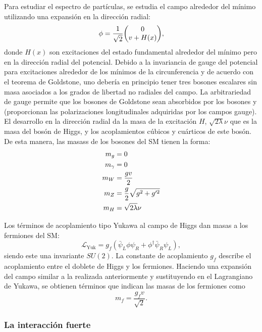 Para estudiar el espectro de partículas, se estudia el campo alrededor del mínimo utilizando una expansión en la dirección radial:
\begin{equation}
    \phi = \frac{1}{\sqrt{2}} \mqty(0 \\ v + H(x)),
\end{equation}
donde \(H(x)\) son excitaciones del estado fundamental alrededor del mínimo pero en la dirección radial del potencial.
Debido a la invariancia de gauge del potencial para excitaciones alrededor de los mínimos de la circunferencia y de acuerdo con el teorema de Goldstone, uno debería en principio tener tres bosones escalares sin masa asociados a los grados de libertad no radiales del campo. La arbitrariedad de gauge permite que los bosones de Goldstone sean absorbidos por los bosones \Wboson y \Zboson (proporcionan las polarizaciones longitudinales adquiridas por los campos gauge). El desarrollo en la dirección radial da la masa de la excitación \(H\), \(\sqrt{2\lambda}\nu\) que es la masa del bosón de Higgs, y los acoplamientos cúbicos y cuárticos de este bosón. De esta manera, las masass de los bosones del \ac{SM} tienen la forma:
\begin{align}
    m_{g} &= 0\\
    m_{\gamma} &= 0\\
    m_{W} & = \frac{g v}{2}\\
    m_{Z} & = \frac{g}{2} \sqrt{g^2 + g'^2}\\
    m_{H} & = \sqrt{2\lambda}\nu
\end{align}

Los términos de acoplamiento tipo Yukawa al campo de Higgs dan masas a los fermiones del \ac{SM}:
\begin{equation}
    \mathcal{L}_{\text{Yuk}} = g_f \left(\bar{\psi}_L \phi \psi_R + \phi^{\dagger} \bar{\psi}_R \psi_L\right),
\end{equation}
siendo este una invariante \(SU(2)\). La constante de acoplamiento \(g_f\) describe el acoplamiento entre el doblete de Higgs y los fermiones. Haciendo una expansión del campo similar a la realizada anteriormente y sustituyendo en el Lagrangiano de Yukawa, se obtienen términos que indican las masas de los fermiones como
\begin{equation}
    m_f = \frac{g_f v}{\sqrt{2}}.
\end{equation}


\subsubsection{La interacción fuerte}
\label{subsubsec:theory:sm:mathematical:qcd}

